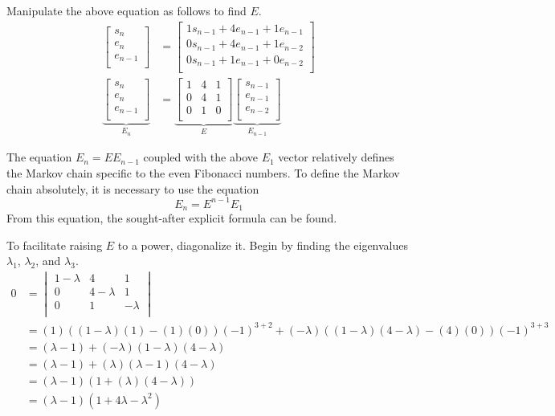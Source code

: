\documentclass[titlepage]{article}
\begin{document}
Manipulate the above equation as follows to find $E$.
\begin{align*}
    \begin{bmatrix}
        s_n\\
        e_n\\
        e_{n-1}\\
    \end{bmatrix}
    &=
    \begin{bmatrix}
        1s_{n-1}+4e_{n-1}+1e_{n-1}\\
        0s_{n-1}+4e_{n-1}+1e_{n-2}\\
        0s_{n-1}+1e_{n-1}+0e_{n-2}\\
    \end{bmatrix}\\
    \underbrace{
        \begin{bmatrix}
            s_n\\
            e_n\\
            e_{n-1}\\
        \end{bmatrix}
    }_{E_n}
    &=
    \underbrace{
        \begin{bmatrix}
            1 & 4 & 1\\
            0 & 4 & 1\\
            0 & 1 & 0\\
        \end{bmatrix}
    }_E
    \underbrace{
        \begin{bmatrix}
            s_{n-1}\\
            e_{n-1}\\
            e_{n-2}\\
        \end{bmatrix}
    }_{E_{n-1}}
\end{align*}\par
The equation $E_n=EE_{n-1}$ coupled with the above $E_1$ vector relatively defines the Markov chain specific to the even Fibonacci numbers. To define the Markov chain absolutely, it is necessary to use the equation$$E_n=E^{n-1}E_1$$From this equation, the sought-after explicit formula can be found.\par
To facilitate raising $E$ to a power, diagonalize it. Begin by finding the eigenvalues $\lambda_1$, $\lambda_2$, and $\lambda_3$.
\begin{align*}
    0 &=
    \begin{vmatrix}
        1-\lambda & 4 & 1\\
        0 & 4-\lambda & 1\\
        0 & 1 & -\lambda\\
    \end{vmatrix}\\
    &= (1)((1-\lambda)(1)-(1)(0))(-1)^{3+2}+(-\lambda)((1-\lambda)(4-\lambda)-(4)(0))(-1)^{3+3}\\
    &= (\lambda-1)+(-\lambda)(1-\lambda)(4-\lambda)\\
    &= (\lambda-1)+(\lambda)(\lambda-1)(4-\lambda)\\
    &= (\lambda-1)(1+(\lambda)(4-\lambda))\\
    &= (\lambda-1)(1+4\lambda-\lambda^2)
\end{align*}
\end{document}

